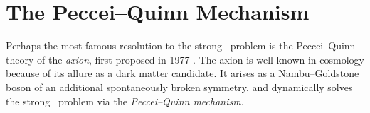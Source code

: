 




\section{The Peccei--Quinn Mechanism}


Perhaps the most famous resolution to the strong \CP\ problem is the Peccei--Quinn theory of the \emph{axion}, first proposed in 1977 \cite{PecceiQuinn_1977}.
The axion is well-known in cosmology because of its allure as a dark matter candidate.
It arises as a Nambu--Goldstone boson of an additional spontaneously broken symmetry, and dynamically solves the strong \CP\ problem via the \emph{Peccei--Quinn mechanism}.

